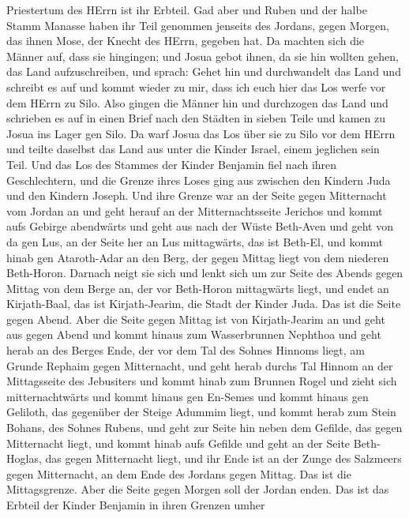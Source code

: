 Priestertum des HErrn ist ihr Erbteil. Gad aber und Ruben und der halbe
Stamm Manasse haben ihr Teil genommen jenseits des Jordans, gegen
Morgen, das ihnen Mose, der Knecht des HErrn, gegeben hat. 
Da machten sich die Männer auf, dass sie hingingen; und Josua gebot
ihnen, da sie hin wollten gehen, das Land aufzuschreiben, und sprach:
Gehet hin und durchwandelt das Land und schreibt es auf und kommt wieder
zu mir, dass ich euch hier das Los werfe vor dem HErrn zu Silo.
 Also gingen die Männer hin und durchzogen das Land und
schrieben es auf in einen Brief nach den Städten in sieben Teile und
kamen zu Josua ins Lager gen Silo.  Da warf Josua das Los
über sie zu Silo vor dem HErrn und teilte daselbst das Land aus unter
die Kinder Israel, einem jeglichen sein Teil.  Und das Los
des Stammes der Kinder Benjamin fiel nach ihren Geschlechtern, und die
Grenze ihres Loses ging aus zwischen den Kindern Juda und den Kindern
Joseph.  Und ihre Grenze war an der Seite gegen Mitternacht
vom Jordan an und geht herauf an der Mitternachtsseite Jerichos und
kommt aufs Gebirge abendwärts und geht aus nach der Wüste Beth-Aven
 und geht von da gen Lus, an der Seite her an Lus
mittagwärts, das ist Beth-El, und kommt hinab gen Ataroth-Adar an den
Berg, der gegen Mittag liegt von dem niederen Beth-Horon. 
Darnach neigt sie sich und lenkt sich um zur Seite des Abends gegen
Mittag von dem Berge an, der vor Beth-Horon mittagwärts liegt, und endet
an Kirjath-Baal, das ist Kirjath-Jearim, die Stadt der Kinder Juda. Das
ist die Seite gegen Abend.  Aber die Seite gegen Mittag ist
von Kirjath-Jearim an und geht aus gegen Abend und kommt hinaus zum
Wasserbrunnen Nephthoa  und geht herab an des Berges Ende,
der vor dem Tal des Sohnes Hinnoms liegt, am Grunde Rephaim gegen
Mitternacht, und geht herab durchs Tal Hinnom an der Mittagsseite des
Jebusiters und kommt hinab zum Brunnen Rogel  und zieht
sich mitternachtwärts und kommt hinaus gen En-Semes und kommt hinaus gen
Geliloth, das gegenüber der Steige Adummim liegt, und kommt herab zum
Stein Bohans, des Sohnes Rubens,  und geht zur Seite hin
neben dem Gefilde, das gegen Mitternacht liegt, und kommt hinab aufs
Gefilde  und geht an der Seite Beth-Hoglas, das gegen
Mitternacht liegt, und ihr Ende ist an der Zunge des Salzmeers gegen
Mitternacht, an dem Ende des Jordans gegen Mittag. Das ist die
Mittagsgrenze.  Aber die Seite gegen Morgen soll der Jordan
enden. Das ist das Erbteil der Kinder Benjamin in ihren Grenzen umher
